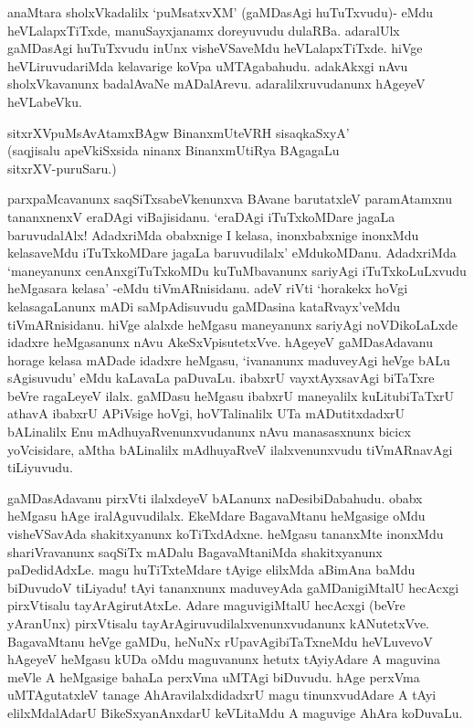 anaMtara sholxVkadalilx `puMsatxvXM' (gaMDasAgi huTuTxvudu)- eMdu heVLalapxTiTxde, manuSayxjanamx doreyuvudu dulaRBa. adaralUlx gaMDasAgi huTuTxvudu inUnx visheVSaveMdu heVLalapxTiTxde. hiVge heVLiruvudariMda kelavarige koVpa uMTAgabahudu. adakAkxgi nAvu sholxVkavanunx badalAvaNe mADalArevu. adaralilxruvudanunx hAgeyeV heVLabeVku.

\begin{shloka}
sitxrXVpuMsAvAtamxBAgw BinanxmUteVRH sisaqkaSxyA'\\
(saqjisalu apeVkiSxsida ninanx BinanxmUtiRya BAgagaLu\\
sitxrXV-puruSaru.)
\end{shloka}

parxpaMcavanunx saqSiTxsabeVkenunxva BAvane barutatxleV paramAtamxnu tananxnenxV eraDAgi viBajisidanu. `eraDAgi iTuTxkoMDare jagaLa baruvudalAlx! AdadxriMda obabxnige I kelasa, inonxbabxnige inonxMdu kelasaveMdu iTuTxkoMDare jagaLa baruvudilalx' eMdukoMDanu. AdadxriMda `maneyanunx cenAnxgiTuTxkoMDu kuTuMbavanunx sariyAgi iTuTxkoLuLxvudu heMgasara kelasa' -eMdu tiVmARnisidanu. adeV riVti `horakekx hoVgi kelasagaLanunx mADi saMpAdisuvudu gaMDasina kataRvayx'veMdu tiVmARnisidanu. hiVge alalxde heMgasu maneyanunx sariyAgi noVDikoLaLxde idadxre heMgasanunx nAvu AkeSxVpisutetxVve. hAgeyeV gaMDasAdavanu horage kelasa mADade idadxre heMgasu, `ivananunx maduveyAgi heVge bALu sAgisuvudu' eMdu kaLavaLa paDuvaLu. ibabxrU vayxtAyxsavAgi biTaTxre beVre ragaLeyeV ilalx. gaMDasu heMgasu ibabxrU maneyalilx kuLitubiTaTxrU athavA ibabxrU APiVsige hoVgi, hoVTalinalilx UTa mADutitxdadxrU bALinalilx Enu mAdhuyaRvenunxvudanunx nAvu manasasxnunx bicicx yoVcisidare, aMtha bALinalilx mAdhuyaRveV ilalxvenunxvudu tiVmARnavAgi tiLiyuvudu.

gaMDasAdavanu pirxVti ilalxdeyeV bALanunx naDesibiDabahudu. obabx heMgasu hAge iralAguvudilalx. EkeMdare BagavaMtanu heMgasige oMdu visheVSavAda shakitxyanunx koTiTxdAdxne. heMgasu tananxMte inonxMdu shariVravanunx saqSiTx mADalu BagavaMtaniMda shakitxyanunx paDedidAdxLe. magu huTiTxteMdare tAyige elilxMda aBimAna baMdu biDuvudoV tiLiyadu! tAyi tananxnunx maduveyAda gaMDanigiMtalU hecAcxgi pirxVtisalu tayArAgirutAtxLe. Adare maguvigiMtalU hecAcxgi (beVre yAranUnx) pirxVtisalu tayArAgiruvudilalxvenunxvudanunx kANutetxVve. BagavaMtanu heVge gaMDu, heNuNx rUpavAgibiTaTxneMdu heVLuvevoV hAgeyeV heMgasu kUDa oMdu maguvanunx hetutx tAyiyAdare A maguvina meVle A heMgasige bahaLa perxVma uMTAgi biDuvudu. hAge perxVma uMTAgutatxleV tanage AhAravilalxdidadxrU magu tinunxvudAdare A tAyi elilxMdalAdarU BikeSxyanAnxdarU keVLitaMdu A maguvige AhAra koDuvaLu.

